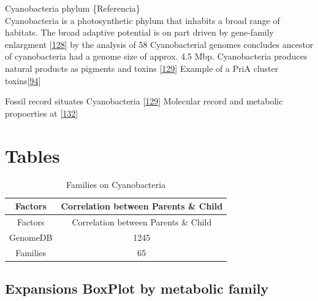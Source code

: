 \documentclass[12pt,twoside]{reedthesis}
\begin{document}
  Cyanobacteria phylum \{Referencia\}\\
  Cyanobacteria is a photosynthetic phylum that inhabits a broad range of
  habitats. The broad adaptive potential is on part driven by gene-family
  enlargment {[}\protect\hyperlink{ref-larssonux5fgenomeux5f2011}{128}{]}
  by the analysis of 58 Cyanobacterial genomes concludes ancestor of
  cyanobacteria had a genome size of approx. 4.5 Mbp. Cyanobacteria
  produces natural products as pigments and toxins
  {[}\protect\hyperlink{ref-whittonux5fecologyux5f2012}{129}{]} Example of
  a PriA cluster
  toxins{[}\protect\hyperlink{ref-moustafaux5foriginux5f2009}{94}{]}
  
  Fossil record situates Cyanobacteria
  {[}\protect\hyperlink{ref-whittonux5fecologyux5f2012}{129}{]} Molecular
  record and metabolic propoerties at
  {[}\protect\hyperlink{ref-battistuzziux5fgenomicux5f2004}{132}{]}
  
  \section{Tables}\label{tables-2}
  
  \begin{longtable}[c]{@{}cc@{}}
  \caption{Families on Cyanobacteria \label{tab:inher}}\tabularnewline
  \toprule
  Factors & Correlation between Parents \& Child\tabularnewline
  \midrule
  \endfirsthead
  \toprule
  Factors & Correlation between Parents \& Child\tabularnewline
  \midrule
  \endhead
  GenomeDB & 1245\tabularnewline
  Families & 65\tabularnewline
  \bottomrule
  \end{longtable}
  
  \clearpage
  
  \subsection{Expansions BoxPlot by metabolic
  family}\label{expansions-boxplot-by-metabolic-family-2}
  
  \begin{Shaded}
  \begin{Highlighting}[]
  \NormalTok{(} \NormalTok{, } \NormalTok{,} \NormalTok{, } \NormalTok{)}
  \end{Highlighting}
  \end{Shaded}
  
\end{document}

